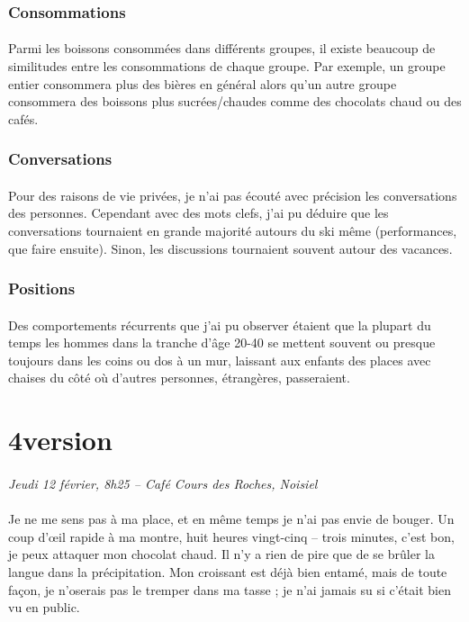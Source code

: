 \subsubsection{Consommations}
\paragraph{}
Parmi les boissons consommées dans différents groupes, il existe beaucoup de
similitudes entre les consommations de chaque groupe. Par exemple, un groupe
entier consommera plus des bières en général alors qu'un autre groupe
consommera des boissons plus sucrées/chaudes comme des chocolats chaud ou des
cafés.

\subsubsection{Conversations}
\paragraph{}
Pour des raisons de vie privées, je n'ai pas écouté avec précision les
conversations des personnes. Cependant avec des mots clefs, j'ai pu déduire
que les conversations tournaient en grande majorité autours du ski même
(performances, que faire ensuite). Sinon, les discussions tournaient souvent
autour des vacances.

\subsubsection{Positions}
\paragraph{}
Des comportements récurrents que j'ai pu observer étaient que la plupart du
temps les hommes dans la tranche d'âge 20-40 se mettent souvent ou presque
toujours dans les coins ou dos à un mur, laissant aux enfants des places avec
chaises du côté où d'autres personnes, étrangères, passeraient.

\section{4\ieme version}
\paragraph{}
\emph{Jeudi 12 février, 8h25 – Café Cours des Roches, Noisiel}

\paragraph{}
Je ne me sens pas à ma place, et en même temps je n’ai pas envie de bouger. Un
coup d’œil rapide à ma montre, huit heures vingt-cinq – trois minutes, c’est
bon, je peux attaquer mon chocolat chaud. Il n’y a rien de pire que de se
brûler la langue dans la précipitation. Mon croissant est déjà bien entamé,
mais de toute façon, je n’oserais pas le tremper dans ma tasse ; je n’ai jamais
su si c’était bien vu en public.

